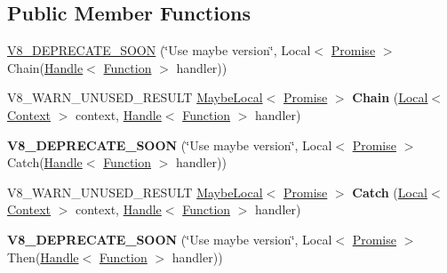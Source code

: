 \subsection*{Public Member Functions}
\begin{DoxyCompactItemize}
\item 
\hyperlink{classv8_1_1_promise_a4a3fa320172da399f5a88ff513454c28}{V8\+\_\+\+D\+E\+P\+R\+E\+C\+A\+T\+E\+\_\+\+S\+O\+O\+N} (\char`\"{}Use maybe version\char`\"{}, Local$<$ \hyperlink{classv8_1_1_promise}{Promise} $>$ Chain(\hyperlink{classv8_1_1_local}{Handle}$<$ \hyperlink{classv8_1_1_function}{Function} $>$ handler))
\item 
\hypertarget{classv8_1_1_promise_a5ac65455340bb37916704a8e5333894c}{}V8\+\_\+\+W\+A\+R\+N\+\_\+\+U\+N\+U\+S\+E\+D\+\_\+\+R\+E\+S\+U\+L\+T \hyperlink{classv8_1_1_maybe_local}{Maybe\+Local}$<$ \hyperlink{classv8_1_1_promise}{Promise} $>$ {\bfseries Chain} (\hyperlink{classv8_1_1_local}{Local}$<$ \hyperlink{classv8_1_1_context}{Context} $>$ context, \hyperlink{classv8_1_1_local}{Handle}$<$ \hyperlink{classv8_1_1_function}{Function} $>$ handler)\label{classv8_1_1_promise_a5ac65455340bb37916704a8e5333894c}

\item 
\hypertarget{classv8_1_1_promise_aca8519c74f758aff9442c41769839a51}{}{\bfseries V8\+\_\+\+D\+E\+P\+R\+E\+C\+A\+T\+E\+\_\+\+S\+O\+O\+N} (\char`\"{}Use maybe version\char`\"{}, Local$<$ \hyperlink{classv8_1_1_promise}{Promise} $>$ Catch(\hyperlink{classv8_1_1_local}{Handle}$<$ \hyperlink{classv8_1_1_function}{Function} $>$ handler))\label{classv8_1_1_promise_aca8519c74f758aff9442c41769839a51}

\item 
\hypertarget{classv8_1_1_promise_aab584a0a149544b7a1da6a46bad498ba}{}V8\+\_\+\+W\+A\+R\+N\+\_\+\+U\+N\+U\+S\+E\+D\+\_\+\+R\+E\+S\+U\+L\+T \hyperlink{classv8_1_1_maybe_local}{Maybe\+Local}$<$ \hyperlink{classv8_1_1_promise}{Promise} $>$ {\bfseries Catch} (\hyperlink{classv8_1_1_local}{Local}$<$ \hyperlink{classv8_1_1_context}{Context} $>$ context, \hyperlink{classv8_1_1_local}{Handle}$<$ \hyperlink{classv8_1_1_function}{Function} $>$ handler)\label{classv8_1_1_promise_aab584a0a149544b7a1da6a46bad498ba}

\item 
\hypertarget{classv8_1_1_promise_a7d7ad4d2be57675ddc0c349daf65e892}{}{\bfseries V8\+\_\+\+D\+E\+P\+R\+E\+C\+A\+T\+E\+\_\+\+S\+O\+O\+N} (\char`\"{}Use maybe version\char`\"{}, Local$<$ \hyperlink{classv8_1_1_promise}{Promise} $>$ Then(\hyperlink{classv8_1_1_local}{Handle}$<$ \hyperlink{classv8_1_1_function}{Function} $>$ handler))\label{classv8_1_1_promise_a7d7ad4d2be57675ddc0c349daf65e892}


\end{DoxyCompactItemize}
